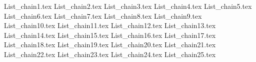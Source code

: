 List_chain1.tex                 
List_chain2.tex                 
List_chain3.tex                 
List_chain4.tex                 
List_chain5.tex                 
List_chain6.tex                 
List_chain7.tex                 
List_chain8.tex                 
List_chain9.tex                 
List_chain10.tex                
List_chain11.tex                
List_chain12.tex                
List_chain13.tex                
List_chain14.tex                
List_chain15.tex                
List_chain16.tex                
List_chain17.tex                
List_chain18.tex                
List_chain19.tex                
List_chain20.tex                
List_chain21.tex                
List_chain22.tex                
List_chain23.tex                
List_chain24.tex                
List_chain25.tex                
